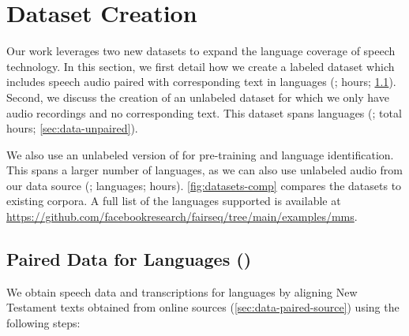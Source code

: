\section{Dataset Creation}
\label{sec:datasets}

Our work leverages two new datasets to expand the language coverage of speech technology.
In this section, we first detail how we create a labeled dataset which includes speech audio paired with corresponding text in \nummmslang{} languages (\MMS{}; \nummmshrs{} hours; \textsection\ref{sec:data-paired}). 
Second, we discuss the creation of an unlabeled dataset for which we only have audio recordings and no corresponding text.
This dataset spans \numgrnlang{} languages (\GRN{}; {\numgrnhrs} total hours; \textsection\ref{sec:data-unpaired}). 

We also use an unlabeled version of \MMS{} for pre-training and language identification. 
This spans a larger number of languages, as we can also use unlabeled audio from our data source (\MMSU{}; \nummmsulang{} languages; {\nummmsuhrs} hours). 
\autoref{fig:datasets-comp} compares the datasets to existing corpora.
A full list of the languages supported is available at \url{https://github.com/facebookresearch/fairseq/tree/main/examples/mms}.

\insertDatasetLanguageComparison

\subsection{Paired Data for \nummmslang{} Languages (\MMS{})}
\label{sec:data-paired}

We obtain speech data and transcriptions for \nummmslang{} languages by aligning New Testament texts obtained from online sources (\textsection\ref{sec:data-paired-source}) using the following steps:


